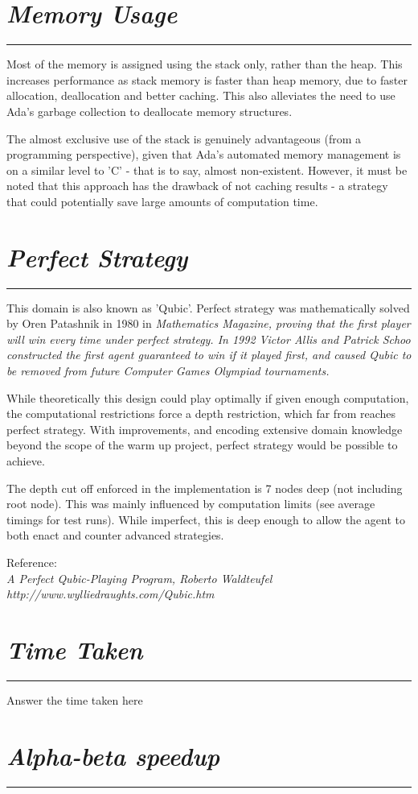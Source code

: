 \documentclass[10pt]{report}
\begin{document}
\begin{multicols}{2}
\section*{\emph{\textmd{Memory Usage}}}
\hrule
\vspace{0.4cm}

Most of the memory is assigned using the stack only, rather than the heap. This increases performance as stack memory is faster than heap memory, due to faster allocation, deallocation and better caching. This also alleviates the need to use Ada's garbage collection to deallocate memory structures. 

The almost exclusive use of the stack is genuinely advantageous (from a programming perspective), given that Ada's automated memory management is on a similar level to 'C' - that is to say, almost non-existent. However, it must be noted that this approach has the drawback of not caching results - a strategy that could potentially save large amounts of computation time.

\section*{\emph{{Perfect Strategy}}}
\hrule
\vspace{0.4cm}

This domain is also known as 'Qubic'. Perfect strategy was mathematically solved by Oren Patashnik in 1980 in \em Mathematics Magazine\em, proving that the first player will win every time under perfect strategy. In 1992 Victor Allis and Patrick Schoo constructed the first agent guaranteed to win if it played first, and caused Qubic to be removed from future Computer Games Olympiad tournaments.

While theoretically this design could play optimally if given enough computation, the computational restrictions force a depth restriction, which  far from reaches perfect strategy. With improvements, and encoding extensive domain knowledge beyond the scope of the warm up project, perfect strategy would be possible to achieve.

The depth cut off enforced in the implementation is 7 nodes deep (not including root node). This was mainly influenced by computation limits (see average timings for test runs). While imperfect, this is deep enough to allow the agent to both enact and counter advanced strategies.

Reference: \\
\em A Perfect Qubic-Playing Program\em, Roberto Waldteufel\\
http://www.wylliedraughts.com/Qubic.htm

\section*{\emph{{Time Taken}}}
\hrule
\vspace{0.4cm}

Answer the time taken here

\section*{\emph{\textmd{Alpha-beta speedup}}}
\hrule
\vspace{0.4cm}


\end{multicols}
\end{document}
